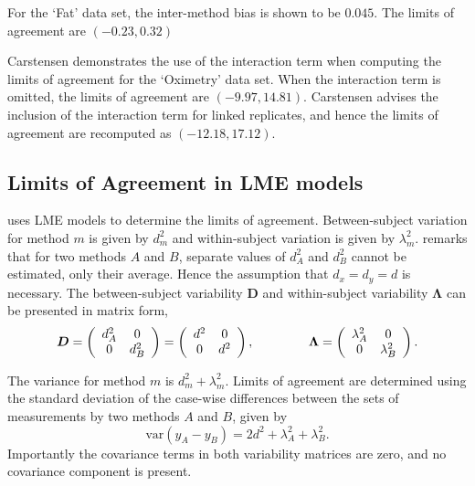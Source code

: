 \documentclass[]{article}
\begin{document}
For the `Fat' data set, the inter-method bias is shown to be $0.045$. The limits of agreement are $(-0.23 , 0.32)$

Carstensen demonstrates the use of the interaction term when computing the limits of agreement for the `Oximetry' data set. When the interaction term is omitted, the limits of agreement are $(-9.97, 14.81)$. Carstensen advises the inclusion of the interaction term for linked replicates, and hence the limits of agreement are recomputed as $(-12.18,17.12)$.


\newpage

\subsection{Limits of Agreement in LME models}
\citet{bxc2008} uses LME models to determine the limits of agreement. Between-subject variation for method $m$ is given by $d^2_{m}$ and within-subject variation is given by $\lambda^2_{m}$.  \citet{BXC2008} remarks that for two methods $A$ and $B$, separate values of $d^2_{A}$ and $d^2_{B}$ cannot be estimated, only their average. Hence the assumption that $d_{x}= d_{y}= d$ is necessary. The between-subject variability $\boldsymbol{D}$ and within-subject variability $\boldsymbol{\Lambda}$ can be presented in matrix form,\[
\boldsymbol{D} = \left(%
\begin{array}{cc}
d^2_{A}& 0 \\
0 & d^2_{B} \\
\end{array}%
\right)=\left(%
\begin{array}{cc}
d^2& 0 \\
0 & d^2\\
\end{array}%
\right),
\hspace{1.5cm}
\boldsymbol{\Lambda} = \left(%
\begin{array}{cc}
\lambda^2_{A}& 0 \\
0 & \lambda^2_{B} \\
\end{array}%
\right).
\]

The variance for method $m$ is $d^2_{m}+\lambda^2_{m}$. Limits of agreement are determined using the standard deviation of the case-wise differences between the sets of measurements by two methods $A$ and $B$, given by
\begin{equation}
\mbox{var} (y_{A}-y_{B}) = 2d^2 + \lambda^2_{A}+ \lambda^2_{B}.
\end{equation}
Importantly the covariance terms in both variability matrices are zero, and no covariance component is present.
\end{document}
